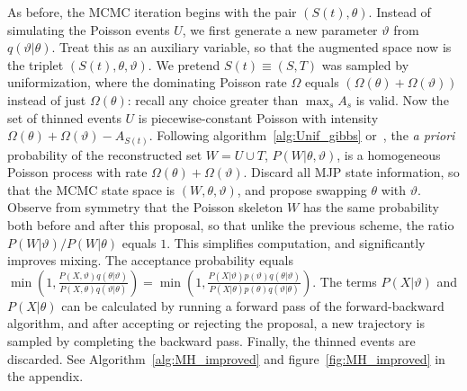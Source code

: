 As before, the MCMC iteration begins with the pair $(S(t), \theta)$. 
Instead of simulating the Poisson events $U$, we first generate a new 
parameter $\vartheta$ from $q(\vartheta|\theta)$. Treat this as an 
auxiliary variable, so that the augmented space now is the triplet 
$(S(t), \theta,\vartheta)$. We pretend $S(t) \equiv (S,T)$ was sampled by  
uniformization, where the dominating Poisson rate $\Omega$ equals 
$(\Omega(\theta) + \Omega(\vartheta))$ instead of just $\Omega(\theta)$:
recall any choice greater than $\max_s A_s$ is valid.
Now the set of thinned events $U$ is piecewise-constant
Poisson with intensity $\Omega(\theta) + \Omega(\vartheta) - 
A_{S(t)}$. Following algorithm~\ref{alg:Unif_gibbs} or~\cite{RaoTeh13}, 
the {\em a priori} probability of the reconstructed set $W = U \cup T$, 
$P(W|\theta,\vartheta)$, is a homogeneous Poisson 
process with rate $\Omega(\theta) + \Omega(\vartheta)$. Discard all 
MJP state information, so that the MCMC state space is $(W, \theta, \vartheta)$,
and propose swapping $\theta$ with $\vartheta$. 
Observe from
symmetry that the Poisson skeleton $W$ has the same probability both
before and after this proposal, so that unlike the previous scheme,
the ratio $P(W|\vartheta)/P(W|\theta)$ equals $1$.  This simplifies 
computation, and significantly improves mixing.
The acceptance probability 
equals
$ 
  \min\left(1, \frac{P(X,\vartheta)q(\theta|\vartheta)}
   {P(X,\theta)q(\vartheta|\theta)}\right) = 
  \min\left(1, \frac{P(X|\vartheta)p(\vartheta)q(\theta|\vartheta)}
   {P(X|\theta)p(\theta)q(\vartheta|\theta)}\right).
   $
   The terms $P(X|\vartheta)$ and  $P(X|\theta)$ can be calculated by 
   running a forward pass of the forward-backward algorithm, and after
   accepting or rejecting the proposal, a new trajectory is sampled by
   completing the backward pass. Finally, the thinned events are
   discarded. See Algorithm~\ref{alg:MH_improved} and 
   figure~\ref{fig:MH_improved} in the appendix. %

